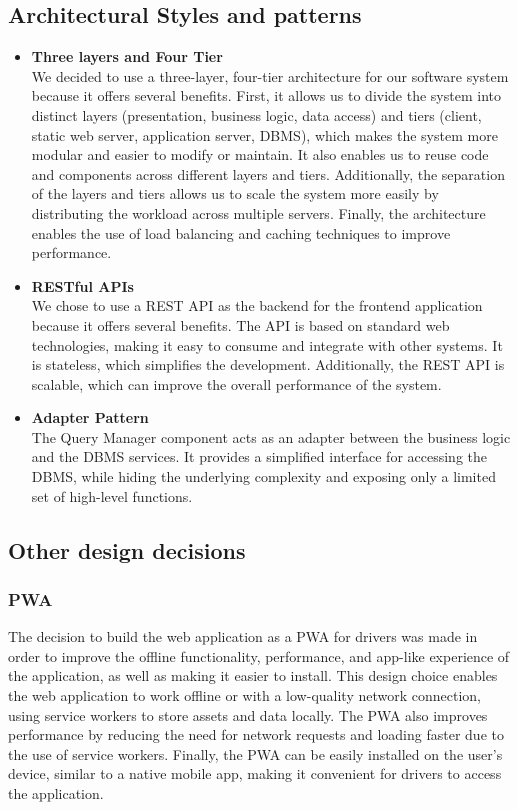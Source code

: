 \subsection{Architectural Styles and patterns}
\begin{itemize}
    \item \textbf{Three layers and Four Tier}\\
    We decided to use a three-layer, four-tier architecture for our software system because it offers several benefits. First, it allows us to divide the system into distinct layers (presentation, business logic, data access) and tiers (client, static web server, application server, DBMS), which makes the system more modular and easier to modify or maintain. It also enables us to reuse code and components across different layers and tiers. Additionally, the separation of the layers and tiers allows us to scale the system more easily by distributing the workload across multiple servers. Finally, the architecture enables the use of load balancing and caching techniques to improve performance.
    \item \textbf{RESTful APIs}\\
    We chose to use a REST API as the backend for the frontend application because it offers several benefits. The API is based on standard web technologies, making it easy to consume and integrate with other systems. It is stateless, which simplifies the development. Additionally, the REST API is scalable, which can improve the overall performance of the system.
    \item \textbf{Adapter Pattern}\\
    The Query Manager component acts as an adapter between the business logic and the DBMS services. It provides a simplified interface for accessing the DBMS, while hiding the underlying complexity and exposing only a limited set of high-level functions.
\end{itemize}
\subsection{Other design decisions}
\subsubsection{PWA}
The decision to build the web application as a PWA for drivers was made in order to improve the offline functionality, performance, and app-like experience of the application, as well as making it easier to install. This design choice enables the web application to work offline or with a low-quality network connection, using service workers to store assets and data locally. The PWA also improves performance by reducing the need for network requests and loading faster due to the use of service workers. Finally, the PWA can be easily installed on the user's device, similar to a native mobile app, making it convenient for drivers to access the application.
